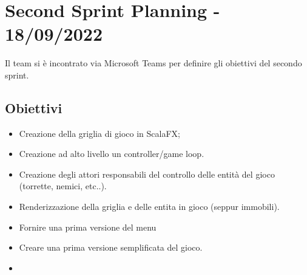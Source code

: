 \section*{Second Sprint Planning - 18/09/2022}
Il team si è incontrato via Microsoft Teams per definire gli obiettivi del secondo sprint.

\subsection*{Obiettivi}
\begin{itemize}
  \item Creazione della griglia di gioco in ScalaFX;
  \item Creazione ad alto livello un controller/game loop.
  \item Creazione degli attori responsabili del controllo delle entità del gioco (torrette, nemici, etc..).
  \item Renderizzazione della griglia e delle entita in gioco (seppur immobili).
  \item Fornire una prima versione del menu
  \item Creare una prima versione semplificata del gioco.
  \item 
\end{itemize}
